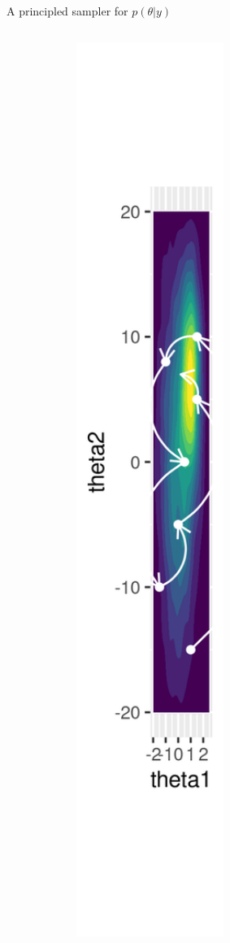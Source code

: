\documentclass[bigger]{beamer}
\begin{document}
\begin{frame}[label={sec:orgb1c3ccd}]{A principled sampler for \(p(\theta|y)\)}
\begin{columns}
\begin{column}{0.2\columnwidth}
\begin{center}
\includegraphics[width=0.7\textwidth]{./figure/sampler_path2.png}
\end{center}
\end{column}
\end{columns}
\end{frame}
\end{document}
